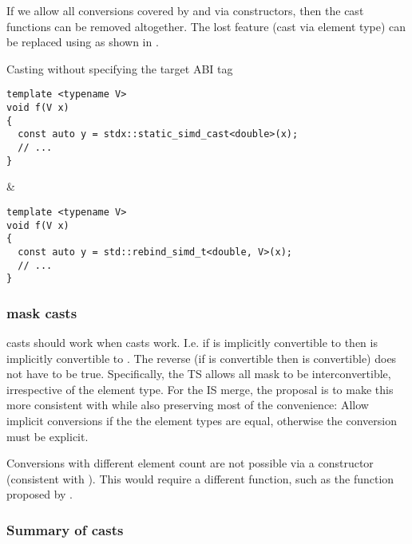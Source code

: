 If we allow all conversions covered by \stdx{} and
\stdx{} via \std{} constructors, then the cast
functions can be removed altogether.
The lost feature (cast via element type) can be replaced using
 as shown in .
\begin{tonytable}{Casting without specifying the target ABI tag}\label{tt:tsvsp1928casts}
  \begin{lstlisting}
template <typename V>
void f(V x)
{
  const auto y = stdx::static_simd_cast<double>(x);
  // ...
}
  \end{lstlisting}
  &
  \begin{lstlisting}
template <typename V>
void f(V x)
{
  const auto y = std::rebind_simd_t<double, V>(x);
  // ...
}
  \end{lstlisting}
\end{tonytable}%

\subsubsection{mask casts}
 casts should work when  casts work.
I.e. if  is implicitly convertible to 
then  is implicitly convertible to .
The reverse (if  is convertible then  is
convertible) does not have to be true.
Specifically, the TS allows all  mask to be
interconvertible, irrespective of the element type.
For the IS merge, the proposal is to make this more consistent with 
while also preserving most of the convenience:
Allow implicit conversions if the  the element types are equal,
otherwise the conversion must be explicit.

Conversions with different element count are not possible via a constructor
(consistent with ).
This would require a different function, such as the 
function proposed by \textcite{P2638R0}.

\subsubsection{Summary of casts}

